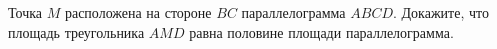 \begin{ex}
	\begin{condition}
		Точка \( M \) расположена на стороне \( BC \) параллелограмма \( ABCD \). Докажите, что площадь треугольника \( AMD \) равна половине площади параллелограмма.
	\end{condition}
\end{ex}